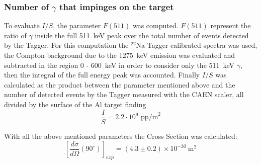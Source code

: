 \subsubsection*{Number of $\gamma$ that impinges on the target}
To evaluate $I/S$, the parameter $F(511)$ was computed. $F(511)$ represent the ratio of $\gamma$ inside the full 511~keV peak over the total number of events detected by the Tagger. For this computation the $^{22}$Na Tagger calibrated spectra was used, the Compton background due to the 1275~keV emission was evaluated and subtracted in the region 0 - 600~keV in order to consider only the 511~keV $\gamma$, then the integral of the full energy peak was accounted.
Finally $I/S$ was calculated as the product between the parameter mentioned above and the number of detected events by the Tagger measured with the CAEN scaler, all divided by the surface of the Al target finding 
\[\dfrac{I}{S} = 2.2\cdot10^{9} \text{ pp/m}^2\]

\bigskip

With all the above mentioned parameters the Cross Section was calculated:
  \begin{equation*}
  	\left[\frac{d\sigma}{d\Omega}(90^{\circ})\right]_{exp}=(4.3\pm0.2) \times 10^{-30}\ \text{m}^{2}
  \end{equation*}
  
  
 
